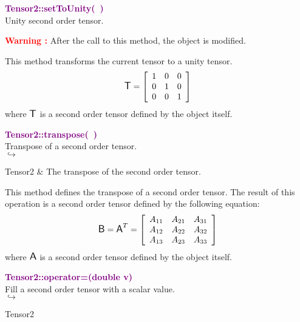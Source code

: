 \textcolor{purple}{\textbf{Tensor2::setToUnity(~)}}\label{Tensor2::setToUnity()}\\
Unity second order tensor.

\hspace*{10mm}\textcolor{red}{\textbf{Warning :}} After the call to this method, the object is modified.

This method transforms the current tensor to a unity tensor.
\begin{equation*}
\mbox{\large\ensuremath{\mathsf{T}}}=\left[\begin{array}{ccc}
1&0&0\\
0&1&0\\
0&0&1
\end{array}\right]
\end{equation*}
where $\mbox{\large\ensuremath{\mathsf{T}}}$ is a second order tensor defined by the object itself.

\textcolor{purple}{\textbf{Tensor2::transpose(~)}}\label{Tensor2::transpose()}\\
Transpose of a second order tensor.\\ \hspace*{5mm}$\hookrightarrow$
\vspace*{-2em}\begin{tcolorbox}[grow to left by=-1cm, width=\textwidth-1cm,myArgs,tabularx={l|R}]
Tensor2 & The transpose of the second order tensor.
\end{tcolorbox}

This method defines the transpose of a second order tensor.
The result of this operation is a second order tensor defined by the following equation:
\begin{equation*}
\mbox{\large\ensuremath{\mathsf{B}}}=\mbox{\large\ensuremath{\mathsf{A}}}^T =\left[\begin{array}{ccc}
  A_{11} & A_{21} & A_{31}\\
  A_{12} & A_{22} & A_{32}\\
  A_{13} & A_{23} & A_{33}
  \end{array}\right]
\end{equation*}
where $\mbox{\large\ensuremath{\mathsf{A}}}$ is a second order tensor defined by the object itself.

\textcolor{purple}{\textbf{Tensor2::operator=(double v)}}\label{Tensor2::operator=(double v)}\\
Fill a second order tensor with a scalar value.\\ \hspace*{5mm}$\hookrightarrow$
\vspace*{-2em}\begin{tcolorbox}[grow to left by=-1cm, width=\textwidth-1cm,myArgs,tabularx={l|R}]
Tensor2
\end{tcolorbox}

